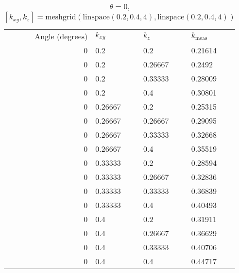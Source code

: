 \begin{table}
\caption{\(\theta=0\), \([k_{xy}, k_z] = \textrm{meshgrid}(\textrm{linspace}(0.2, 0.4, 4), \textrm{linspace}(0.2, 0.4, 4))\)}
\begin{tabular}{r l l | l}
Angle (degrees) & \(k_{xy}\) & \(k_z\) & \(k_{\textrm{meas}}\)\\
0 & 0.2 & 0.2 & 0.21614\\
0 & 0.2 & 0.26667 & 0.2492\\
0 & 0.2 & 0.33333 & 0.28009\\
0 & 0.2 & 0.4 & 0.30801\\
0 & 0.26667 & 0.2 & 0.25315\\
0 & 0.26667 & 0.26667 & 0.29095\\
0 & 0.26667 & 0.33333 & 0.32668\\
0 & 0.26667 & 0.4 & 0.35519\\
0 & 0.33333 & 0.2 & 0.28594\\
0 & 0.33333 & 0.26667 & 0.32836\\
0 & 0.33333 & 0.33333 & 0.36839\\
0 & 0.33333 & 0.4 & 0.40493\\
0 & 0.4 & 0.2 & 0.31911\\
0 & 0.4 & 0.26667 & 0.36629\\
0 & 0.4 & 0.33333 & 0.40706\\
0 & 0.4 & 0.4 & 0.44717\\
\end{tabular}
\end{table}

